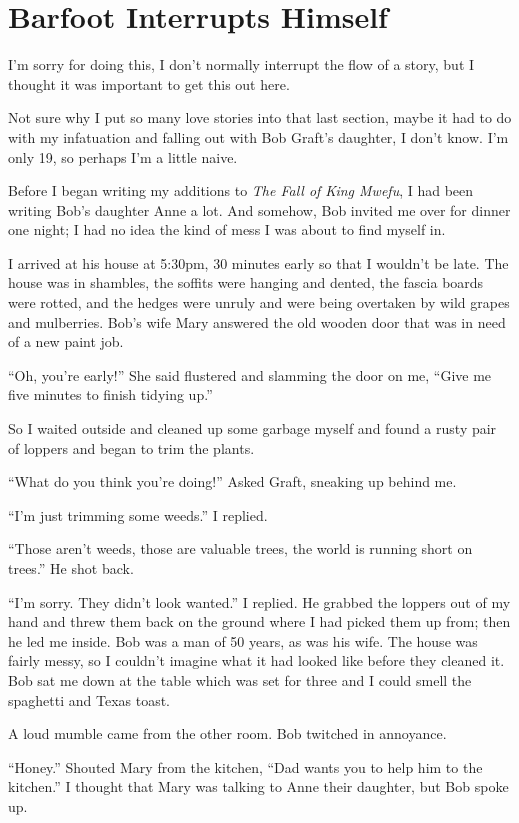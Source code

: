 \section{Barfoot Interrupts Himself}
I'm sorry for doing this, I don't normally interrupt the flow of a story, but I thought it was important to get this out here.

Not sure why I put so many love stories into that last section, maybe it had to do with my infatuation and falling out with Bob Graft's daughter, I don't know. I'm only 19, so perhaps I'm a little naive.

Before I began writing my additions to \emph{The Fall of King Mwefu},
I had been writing Bob's daughter Anne a lot. And somehow, Bob invited me over for dinner one night; I had no idea the kind of mess I was about to find myself in.

I arrived at his house at 5:30pm, 30 minutes early so that I wouldn't be late. The house was in shambles, the soffits were hanging and dented, the fascia boards were rotted, and the hedges were unruly and were being overtaken by wild grapes and mulberries. Bob's wife Mary answered the old wooden door that was in need of a new paint job.

``Oh, you're early!'' She said flustered and slamming the door on me, ``Give me five minutes to finish tidying up.''

So I waited outside and cleaned up some garbage myself and found a rusty pair of loppers and began to trim the plants.

``What do you think you're doing!'' Asked Graft, sneaking up behind me.

``I'm just trimming some weeds.'' I replied.

``Those aren't weeds, those are valuable trees, the world is running short on trees.'' He shot back.

``I'm sorry. They didn't look wanted.'' I replied. He grabbed the loppers out of my hand and threw them back on the ground where I had picked them up from; then he led me inside. Bob was a man of 50 years, as was his wife.
The house was fairly messy, so I couldn't imagine what it had looked like before they cleaned it.
Bob sat me down at the table which was set for three and I could smell the spaghetti and Texas toast.

A loud mumble came from the other room. Bob twitched in annoyance.

``Honey.'' Shouted Mary from the kitchen, ``Dad wants you to help him to the kitchen.''
I thought that Mary was talking to Anne their daughter, but Bob spoke up.

